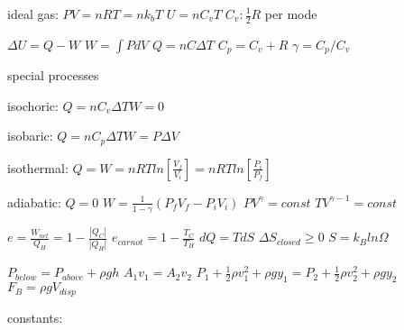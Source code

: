 \documentclass{exam}
\begin{document}
\noindent
ideal gas: $PV = nRT = nk_bT$
\hspace{4mm}
$U = nC_vT$
$C_v: \frac{1}{2}R$ per mode


\noindent
$\Delta U = Q - W$
$W=\int P dV$
$Q = nC\Delta T$
$C_p = C_v + R$
$\gamma = C_p/C_v$

\noindent
special processes

isochoric: $Q=nC_v\Delta T$\hspace{4mm}$W=0$

isobaric: $Q=nC_p\Delta T$\hspace{4mm}$W=P\Delta V$

isothermal: $Q=W=nRTln\left[\frac{V_f}{V_i}\right]=nRTln\left[\frac{P_i}{P_f}\right]$

adiabatic: $Q=0$ \hspace{4mm}$W=\frac{1}{1-\gamma}(P_fV_f-P_iV_i)$
\hspace{4mm} $PV^\gamma=const$
\hspace{4mm} $TV^{\gamma-1}=const$

\noindent
$e = \frac{W_{net}}{Q_H} = 1 - \frac{|Q_C|}{|Q_H|}$
$e_{carnot}=1 - \frac{T_C}{T_H}$
$dQ=TdS$
$\Delta S_{closed} \ge 0$
$S = k_B ln \Omega$

\noindent
$P_{below} = P_{above} + \rho g h$
$A_1v_1 = A_2v_2$
$P_1 + \frac{1}{2}\rho v^2_1 + \rho g y_1 = P_2 + \frac{1}{2}\rho v^2_2 + \rho g y_2$
$F_B = \rho g V_{disp}$


\noindent
constants:
\end{document}
